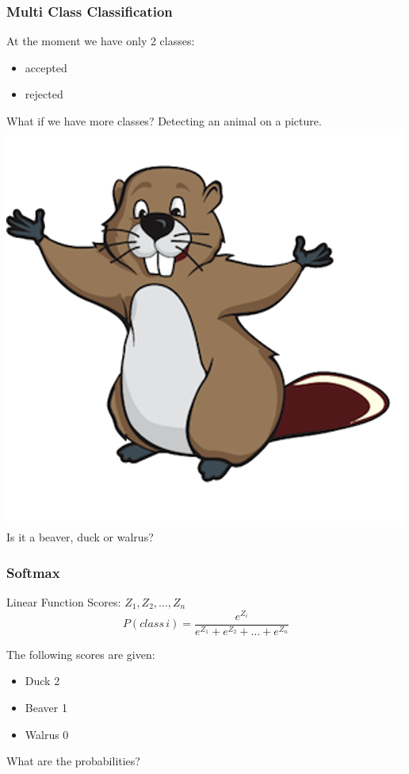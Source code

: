 \begin{frame}[fragile]
  \frametitle{Multi Class Classification}
  At the moment we have only 2 classes:
  \begin{itemize}
  \item accepted
  \item rejected
  \end{itemize}
  What if we have more classes? Detecting an animal on a picture.\\
  \includegraphics[scale=0.18]{img/beaver}\\
  Is it a beaver, duck or walrus?
\end{frame}

\begin{frame}[fragile]
  \frametitle{Softmax}
  Linear Function Scores: $Z_1, Z_2, \hdots, Z_n$\\
  \vspace{3mm}
  \begin{displaymath}
  P(class\,i) = \frac{e^{Z_i}}{e^{Z_1}+e^{Z_2}+\hdots+e^{Z_n}}
  \end{displaymath}
  \begin{exercise}
  The following scores are given:
  \begin{itemize}
  \item Duck 2
  \item Beaver 1
  \item Walrus 0
  \end{itemize}
  What are the probabilities?
  \end{exercise}
\end{frame}


